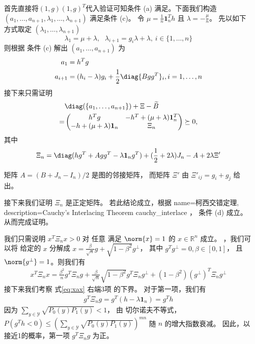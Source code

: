 首先直接将$(1,g)(1,g)^T$代入验证可知条件 (a) 满足。下面我们构造  $(a_1,\ldots,a_{n+1},\lambda_1,\ldots,\lambda_{n+1})$  满足条件 (c)。
令 $\mu=\frac{1}{n}\mathbf{1}_n^T h$ 且
$\lambda = -\frac{\mu}{n}$。 先以如下方式取定 $(\lambda_1,\ldots,\lambda_{n+1})$
$$
\lambda_1=\mu+\lambda, \text{  }\lambda_{i+1}=g_i\lambda + \lambda,~i\in\{1,\ldots,n\}
$$
则根据 条件 (c) 解出 $(a_1, \dots, a_{n+1})$ 为
\begin{align}
    a_1 &= h^T g \nonumber\\
    a_{i+1} & = (h_i -\lambda)g_i  + \frac{1}{2}\diag\{Bgg^T\}_i, i = 1, \dots, n
\end{align}
接下来只需证明
\begin{align}
    &\diag(\{a_1, \dots, a_{n+1}\}) + \Xi - \widetilde{B} \nonumber\\
    =& \begin{pmatrix} h^T g & -h^T +(\mu + \lambda)\mathbf{1}_n^T \\
        -h+(\mu + \lambda )\mathbf{1}_n & \Xi_n \end{pmatrix}
    \succeq 0, 
\end{align}
其中
\begin{align}\label{eq:Xi_n}
    \Xi_n =\diag(hg^T + Agg^T -\lambda \mathbf{1}_ng^T)
    + (\frac{1}{2} +2\lambda) J_n  - A + 2\lambda \Xi'
\end{align}

矩阵 $A=(B+J_n-I_n)/2$ 是图的邻接矩阵，
而矩阵 $\Xi'$ 由 $\Xi'_{ij}=g_i + g_j$ 给出。

接下来我们证明 $\Xi_n$ 是正定矩阵。
若此结论成立，根据
{name=柯西交错定理,
description={Cauchy's Interlacing Theorem}}
\gls{cauchy_interlace} \cite{hwang}，
条件 (d) 成立。
从而完成证明。

我们只需说明 $x^T \Xi_n x>0$ 对 任意 满足 $\norm{x}=1$ 的 $x \in \mathbb{R}^n$ 成立。
，我们可以将 给定的 $x$ 分解成 $x=\frac{\beta}{\sqrt{n}} g
+ \sqrt{1-\beta^2} g^{\perp}$， 其中 $g^Tg^{\perp}=0, \beta \in [0,1]$，
且 $\norm{g^{\perp}}=1$。则我们有 
\begin{align}\label{eq:xax}
    x^T \Xi_n x = \frac{\beta^2}{n} g^T \Xi_n g  
    +		\frac{\beta}{\sqrt{n}}\sqrt{1-\beta^2} g^T \Xi_n g^{\perp}
    +
    (1-\beta^2)(g^{\perp})^T \Xi_n g^{\perp}
\end{align}
接下来我们考察 式\eqref{eq:xax} 右端3项
的下界。
对于第一项，我们有
\begin{align*}
    g^T \Xi_n g = g^T(h -\lambda \mathbf{1}_n)   = g^T h
\end{align*}
因为 $\sum_{y \in \mathcal{Y}} \sqrt{P_0(y)P_1(y)} < 1$，
由 切尔诺夫不等式， 
$P(g^T h < 0) \leq (\sum_{y \in \mathcal{Y}} \sqrt{P_0(y)P_1(y)})^{mn}$
随 $n$ 的增大指数衰减。
因此，以接近1的概率，第一项 $g^T \Xi_n g$ 为正。

